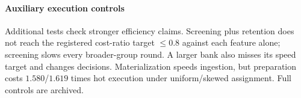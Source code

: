 \paragraph{Auxiliary execution controls}
Additional tests check stronger efficiency claims. Screening plus retention does not reach the registered cost-ratio target $\le0.8$ against each feature alone; screening slows every broader-group round. A larger bank also misses its speed target and changes decisions. Materialization speeds ingestion, but preparation costs $1.580$/$1.619$ times hot execution under uniform/skewed assignment. Full controls are archived.
